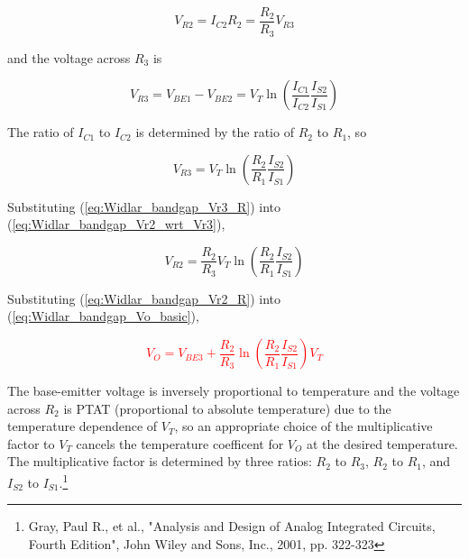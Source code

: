\begin{equation}
V_{R2} = I_{C2}R_{2} = \frac{R_{2}}{R_{3}}V_{R3}
\label{eq:Widlar_bandgap_Vr2_wrt_Vr3}
\end{equation}

\noindent and the voltage across $R_{3}$ is

\begin{equation}
V_{R3} = V_{BE1} - V_{BE2} = V_{T}\ln\left(\frac{I_{C1}}{I_{C2}}\frac{I_{S2}}{I_{S1}}\right)
\end{equation}

\noindent The ratio of $I_{C1}$ to $I_{C2}$ is determined by the ratio of $R_{2}$ to $R_{1}$, so %

\begin{equation}
V_{R3} = V_{T}\ln\left(\frac{R_{2}}{R_{1}}\frac{I_{S2}}{I_{S1}}\right)
\label{eq:Widlar_bandgap_Vr3_R}
\end{equation}

\noindent Substituting (\ref{eq:Widlar_bandgap_Vr3_R}) into (\ref{eq:Widlar_bandgap_Vr2_wrt_Vr3}),

\begin{equation}
V_{R2} = \frac{R_{2}}{R_{3}}V_{T}\ln\left(\frac{R_{2}}{R_{1}}\frac{I_{S2}}{I_{S1}}\right)
\label{eq:Widlar_bandgap_Vr2_R}
\end{equation}

\noindent Substituting (\ref{eq:Widlar_bandgap_Vr2_R}) into (\ref{eq:Widlar_bandgap_Vo_basic}),

\textcolor{red}{
\begin{equation}
V_{O} = V_{BE3} + \frac{R_{2}}{R_{3}}\ln\left(\frac{R_{2}}{R_{1}}\frac{I_{S2}}{I_{S1}}\right)V_{T}
\end{equation}
}

\noindent The base-emitter voltage is inversely proportional to temperature and the voltage across $R_{2}$ is PTAT (proportional to absolute temperature) due to the temperature dependence of $V_{T}$, so an appropriate choice of the multiplicative factor to $V_{T}$ cancels the temperature coefficent for $V_{O}$ at the desired temperature. The multiplicative factor is determined by three ratios: $R_{2}$ to $R_{3}$, $R_{2}$ to $R_{1}$, and $I_{S2}$ to $I_{S1}$.\footnote{Gray, Paul R., et al., "Analysis and Design of Analog Integrated Circuits, Fourth Edition", John Wiley and Sons, Inc., 2001, pp. 322-323}



